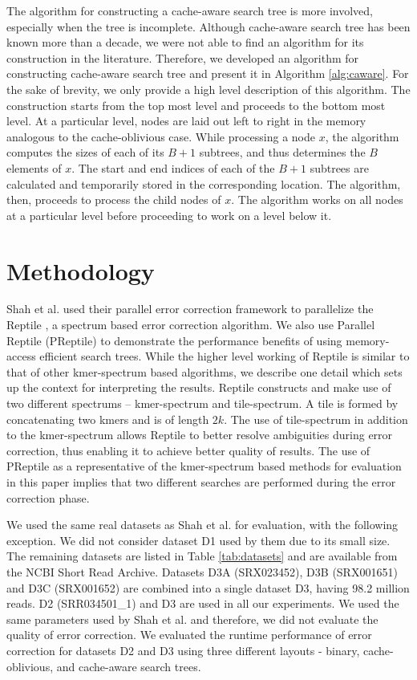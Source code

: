 \documentclass[10pt, conference]{IEEEtran}
\begin{document}
The algorithm for constructing a cache-aware search tree is more involved, especially when the tree is incomplete. Although cache-aware search tree has been known more than a decade, we were not able to find an algorithm for its construction in the literature. Therefore, we developed an algorithm for  constructing cache-aware search tree and present it in Algorithm \ref{alg:caware}. For the sake of brevity, we only provide a high level description of this algorithm. The construction starts from the top most level and proceeds to the bottom most level. At a particular level, nodes are laid out left to right in the memory analogous to the cache-oblivious case. While processing a node $x$, the algorithm computes the sizes of each of its $B+1$ subtrees, and thus determines the $B$ elements of $x$. The start and end indices of each of the $B+1$ subtrees are calculated and temporarily stored in the corresponding location. The algorithm, then, proceeds to process the child nodes of $x$. The algorithm works on all nodes at a particular level before proceeding to work on a level below it.


\section{Methodology} \label{sec_Methodology}
Shah et al. \cite{shah2012parallel} used their parallel error correction framework to parallelize the Reptile \cite{yang2010reptile}, a spectrum based error correction algorithm. We also use Parallel Reptile (PReptile) to demonstrate  the performance benefits of using  memory-access efficient search trees. While the higher level working of Reptile is similar to that of other kmer-spectrum based algorithms, we describe one detail which sets up the context for interpreting the results. Reptile constructs and make use of two different spectrums -- kmer-spectrum and tile-spectrum. A tile is formed by concatenating two kmers and  is of length $2k$. The use of tile-spectrum in addition to the kmer-spectrum allows Reptile to better resolve ambiguities during error correction, thus enabling it to achieve better quality of results. The use of PReptile as a representative of the kmer-spectrum based methods for evaluation in this paper implies that two different searches are performed during the error correction phase.

We used the same real datasets as Shah et al. \cite{shah2012parallel} for evaluation, with the following exception. We did not consider dataset D1 used by them due to its small size. The remaining datasets are listed in Table \ref{tab:datasets} and are available from the NCBI Short Read Archive. Datasets D3A (SRX023452), D3B (SRX001651) and D3C (SRX001652) are combined into a single dataset D3, having 98.2 million reads. D2 (SRR034501\_1) and D3 are used in all our experiments. We used the same parameters used by Shah et al. \cite{shah2012parallel} and therefore, we did not evaluate the quality of error correction. We evaluated the runtime performance of error correction for datasets D2 and D3 using three different layouts - binary, cache-oblivious, and cache-aware search trees.
\end{document}
